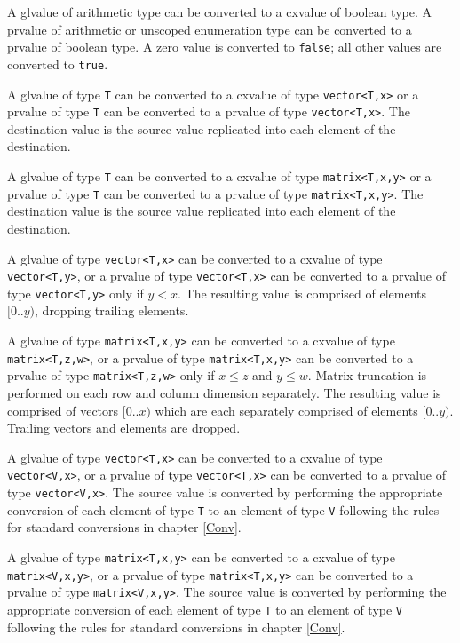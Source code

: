 \p A glvalue of arithmetic type can be converted to a cxvalue of boolean type. A
prvalue of arithmetic or unscoped enumeration type can be converted to a prvalue
of boolean type. A zero value is converted to \texttt{false}; all other values
are converted to \texttt{true}.


\p A glvalue of type \texttt{T} can be converted to a cxvalue of type
\texttt{vector<T,x>} or a prvalue of type \texttt{T} can be converted to a
prvalue of type \texttt{vector<T,x>}. The destination value is the source value
replicated into each element of the destination.

\p A glvalue of type \texttt{T} can be converted to a cxvalue of type
\texttt{matrix<T,x,y>} or a prvalue of type \texttt{T} can be converted to a
prvalue of type \texttt{matrix<T,x,y>}. The destination value is the source
value replicated into each element of the destination.


\p A glvalue of type \texttt{vector<T,x>} can be converted to a cxvalue of type
\texttt{vector<T,y>}, or a prvalue of type \texttt{vector<T,x>} can be converted
to a prvalue of type \texttt{vector<T,y>} only if \( y < x \). The resulting
value is comprised of elements \( [0..y) \), dropping trailing elements.

\p A glvalue of type \texttt{matrix<T,x,y>} can be converted to a cxvalue of type
\texttt{matrix<T,z,w>}, or a prvalue of type \texttt{matrix<T,x,y>} can be
converted to a prvalue of type \texttt{matrix<T,z,w>} only if \( x \leq z \)
and \(y \leq w \). Matrix truncation is performed on each row and column
dimension separately. The resulting value is comprised of vectors \( [0..x) \)
which are each separately comprised of elements \( [0..y) \). Trailing vectors
and elements are dropped.


\p A glvalue of type \texttt{vector<T,x>} can be converted to a cxvalue of type
\texttt{vector<V,x>}, or a prvalue of type \texttt{vector<T,x>} can be converted
to a prvalue of type \texttt{vector<V,x>}. The source value is converted by
performing the appropriate conversion of each element of type \texttt{T} to an
element of type \texttt{V} following the rules for standard conversions
in chapter \ref{Conv}.

\p A glvalue of type \texttt{matrix<T,x,y>} can be converted to a cxvalue of
type \texttt{matrix<V,x,y>}, or a prvalue of type \texttt{matrix<T,x,y>} can be
converted to a prvalue of type \texttt{matrix<V,x,y>}. The source value is
converted by performing the appropriate conversion of each element of type
\texttt{T} to an element of type \texttt{V} following the rules for standard
conversions in chapter \ref{Conv}.

